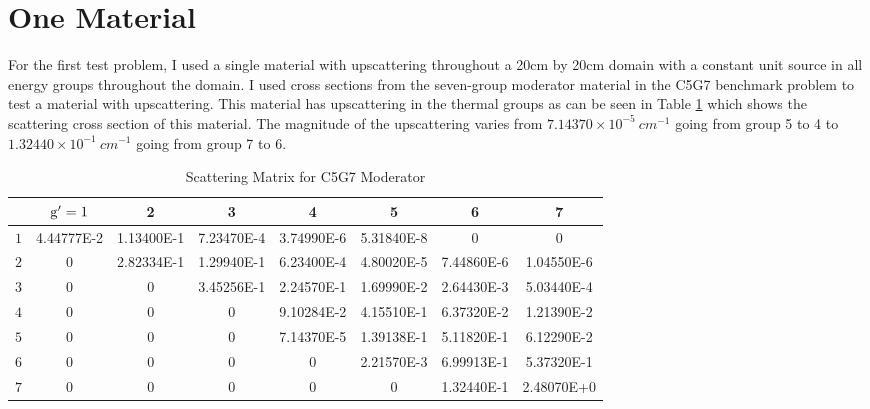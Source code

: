 \section{One Material}
For the first test problem, I used a single material with upscattering throughout a 20cm by 20cm domain with a constant unit source in all energy groups throughout the domain. 
 I used cross sections from the seven-group moderator material in the C5G7 benchmark problem \cite{C5G7} to test a material with upscattering.  This material has upscattering in the thermal groups as can be seen in Table \ref{table:modxs} which shows the scattering cross section of this material. The magnitude of the upscattering varies from $7.14370 \times 10^{-5} \: cm^{-1}$ going from group 5 to 4 to $1.32440 \times 10^{-1} \: cm^{-1}$ going from group 7 to 6. 
 \begin{table}[H]
\footnotesize
\centering
\caption{Scattering Matrix for C5G7 Moderator}
\begin{center}
    \begin{tabular}{|c|c|c|c|c|c|c|c|}
\hline
 & $\mathrm{g}'=1$ & 2 & 3 & 4 & 5 & 6 & 7 \\ 
\hline
 $1$ & 4.44777E-2 &  1.13400E-1 & 7.23470E-4 & 3.74990E-6 & 5.31840E-8     &  0     &    0  \\
\hline
 $2$  & 0       &    2.82334E-1 & 1.29940E-1 & 6.23400E-4  & 4.80020E-5  & 7.44860E-6 &  1.04550E-6 \\
\hline
 $3$  & 0        &      0  &     3.45256E-1 & 2.24570E-1 & 1.69990E-2 & 2.64430E-3 & 5.03440E-4 \\
\hline
 $4$  & 0          &     0    &       0     &  9.10284E-2 & 4.15510E-1 & 6.37320E-2 & 1.21390E-2 \\
\hline
 $5$  & 0        &       0     &      0     & 7.14370E-5 & 1.39138E-1 & 5.11820E-1 & 6.12290E-2 \\
\hline
$6$  & 0        &       0   &    0      &  0     &  2.21570E-3 & 6.99913E-1 &  5.37320E-1 \\
\hline
$7$  & 0       &        0        &   0      &     0      &     0   &    1.32440E-1 & 2.48070E+0 \\
\hline
    \end{tabular}
\end{center}
\label{table:modxs}
\end{table}

